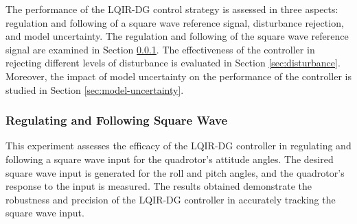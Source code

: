 \documentclass[3p,times]{elsarticle}
\begin{document}
The performance of the LQIR-DG control strategy is assessed in three aspects: regulation and following of a square wave reference signal, disturbance rejection, and model uncertainty. The regulation and following of the square wave reference signal are examined in Section \ref{sec:regulation}. The effectiveness of the controller in rejecting different levels of disturbance is evaluated in Section \ref{sec:disturbance}. Moreover, the impact of model uncertainty on the performance of the controller is studied in Section \ref{sec:model-uncertainty}.

\subsubsection{Regulating and Following Square Wave}\label{sec:regulation}
\noindent This experiment assesses the efficacy of the LQIR-DG controller in regulating and following a square wave input for the quadrotor's attitude angles. The desired square wave input is generated for the roll and pitch angles, and the quadrotor's response to the input is measured. The results obtained demonstrate the robustness and precision of the LQIR-DG controller in accurately tracking the square wave input.
\end{document}
